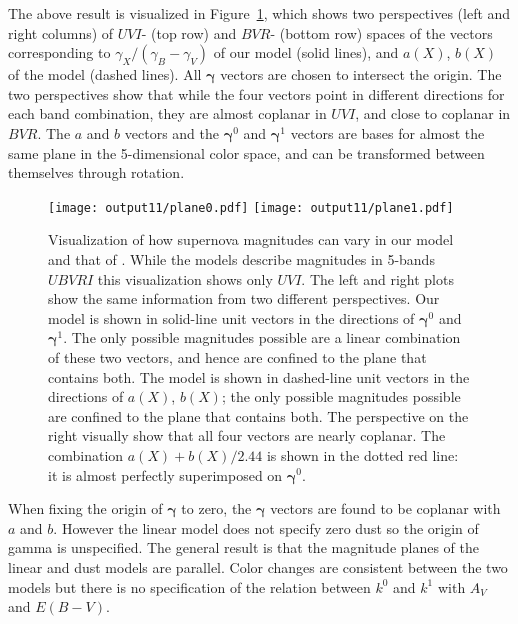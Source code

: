 \documentclass{aastex61}   	%
\begin{document}
The above result is visualized in Figure~\ref{plane:fig}, which  shows two perspectives (left and right columns) of $UVI$- (top row) and $BVR$- (bottom row) spaces
of the vectors corresponding to $\gamma_X/(\gamma_B-\gamma_V)$ of our model (solid lines),
and $a(X)$, $b(X)$ of the  model (dashed lines).  All $\pmb{\gamma}$ vectors are chosen to intersect the origin.
The two perspectives show that while the four vectors point in different directions for each band combination,
they are almost coplanar in $UVI$, and close to coplanar in $BVR$.  The $a$ and $b$ vectors and the $\pmb{\gamma}^0$ and $\pmb{\gamma}^1$
vectors are bases for almost the same plane in the 5-dimensional color space, and can be transformed between themselves through rotation.

\begin{figure}[htbp] %
   \centering
   \texttt{[image: output11/plane0.pdf]}
   \texttt{[image: output11/plane1.pdf]}
   \caption{
   \color{purple}
   Visualization of how supernova magnitudes can vary in our model and that of .  While the models describe
   magnitudes in 5-bands $UBVRI$ this visualization shows only $UVI$.   The left and right plots show the same information from
   two different perspectives.
   Our model is shown in solid-line unit vectors in the directions of $\pmb{\gamma}^0$ and $\pmb{\gamma}^1$. The only possible magnitudes possible
   are a linear combination of these two vectors, and hence are confined to the plane that contains both.
   The   model is shown in dashed-line unit vectors
   in the directions of  $a(X)$, $b(X)$; the only possible magnitudes possible are confined to the plane that contains both.
   The perspective on the right visually show that all four vectors are nearly coplanar.  
   The combination $a(X)+b(X)/2.44$ is shown in the dotted red
   line: it is almost perfectly superimposed on $\pmb{\gamma}^0$.
   \label{plane:fig}}
\end{figure}


When fixing the origin of $\pmb{\gamma}$ to zero, the $\pmb{\gamma}$ vectors are found to be coplanar with $a$ and $b$.
However the linear model does not specify zero dust so the origin of gamma is unspecified.
The general result is that the magnitude planes of the linear and dust models are parallel.
Color changes are consistent between the two models but there is no specification of the relation between $k^0$ and $k^1$ with $A_V$ and $E(B-V)$. 
\end{document}

